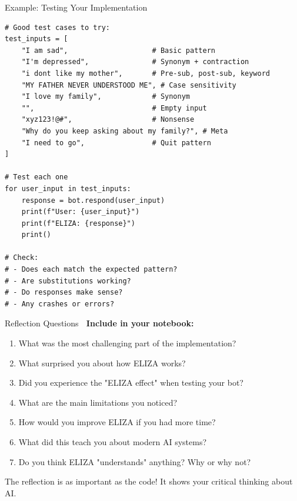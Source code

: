 \documentclass[aspectratio=169]{beamer}
\begin{document}
\begin{frame}[fragile]{Example: Testing Your Implementation 🧪}
\begin{lstlisting}[basicstyle=\ttfamily\tiny]
# Good test cases to try:
test_inputs = [
    "I am sad",                    # Basic pattern
    "I'm depressed",               # Synonym + contraction
    "i dont like my mother",       # Pre-sub, post-sub, keyword
    "MY FATHER NEVER UNDERSTOOD ME", # Case sensitivity
    "I love my family",            # Synonym
    "",                            # Empty input
    "xyz123!@#",                   # Nonsense
    "Why do you keep asking about my family?", # Meta
    "I need to go",                # Quit pattern
]

# Test each one
for user_input in test_inputs:
    response = bot.respond(user_input)
    print(f"User: {user_input}")
    print(f"ELIZA: {response}")
    print()

# Check:
# - Does each match the expected pattern?
# - Are substitutions working?
# - Do responses make sense?
# - Any crashes or errors?
\end{lstlisting}
\end{frame}

\begin{frame}[shrink=10]{Reflection Questions 💭}
\small
\textbf{Include in your notebook:}

\begin{enumerate}\setlength{\itemsep}{0pt}
    \item What was the most challenging part of the implementation?
    \item What surprised you about how ELIZA works?
    \item Did you experience the "ELIZA effect" when testing your bot?
    \item What are the main limitations you noticed?
    \item How would you improve ELIZA if you had more time?
    \item What did this teach you about modern AI systems?
    \item Do you think ELIZA "understands" anything? Why or why not?
\end{enumerate}

\vspace{0.3cm}

\begin{thinkaboutit}
The reflection is as important as the code! It shows your critical thinking about AI.
\end{thinkaboutit}
\end{frame}
\end{document}
